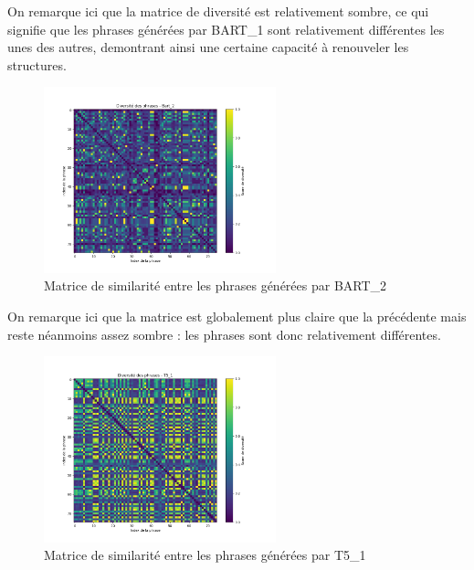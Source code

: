 \documentclass[conference]{IEEEtran}
\begin{document}
\vspace{5mm}

On remarque ici que la matrice de diversité est relativement sombre, ce qui signifie que les phrases générées par BART\_1 sont relativement différentes les unes des autres, demontrant ainsi une certaine capacité à renouveler les structures.

\vspace{5mm}

\begin{figure}[H]
\centering
\includegraphics[width=0.6\textwidth]{images/diversity_matrix_bart_2.png}
\caption{Matrice de similarité entre les phrases générées par BART\_2}
\end{figure}

\vspace{5mm}

On remarque ici que la matrice est globalement plus claire que la précédente mais reste néanmoins assez sombre : les phrases sont donc relativement différentes.

\vspace{5mm}

\begin{figure}[H]
\centering
\includegraphics[width=0.6\textwidth]{images/diversity_matrix_t5_1.png}
\caption{Matrice de similarité entre les phrases générées par T5\_1}
\end{figure}
\end{document}
